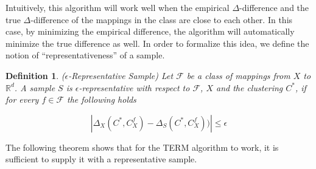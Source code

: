 \documentclass[letterpaper,12pt,titlepage,oneside,final]{book}
\newtheorem{definition}{Definition}
\begin{document}


Intuitively, this algorithm will work well when the empirical $\Delta$-difference and the true $\Delta$-difference of the mappings in the class are close to each other. In this case, by minimizing the empirical difference, the algorithm will automatically minimize the true difference as well. In order to formalize this idea, we define the notion of ``representativeness'' of a sample.



\begin{definition} {($\epsilon$-Representative Sample)} Let $\mathcal{F}$ be a class of mappings from $X$ to $\mathbb{R}^d$. A sample $S$ is $\epsilon$-representative with respect to $\mathcal{F}$, $X$ and the clustering $C^*$, if for every $f\in \mathcal{F}$ the following holds

\begin{equation}
|\Delta_{X}(C^*, C^{f}_X) - \Delta_{S}(C^*, C^{f}_X))| \leq \epsilon
\end{equation}


\end{definition}

The following theorem shows that for the TERM algorithm to work, it is sufficient to supply it with a representative sample. 
\end{document}
